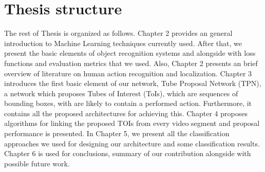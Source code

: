 \section{Thesis structure}
The rest of Thesis is organized as follows. Chapter 2 provides an general introduction to Machine Learning techniques currently used.
After that, we present the basic elements of object recognition systems and alongside with loss functions and evaluation metrics that
we used. Also, Chapter 2 presents an brief overview of literature on human action recognition and localization. Chapter 3 introduces the first basic element of our network, Tube Proposal Network (TPN), a network which proposes Tubes of Interest (ToIs), which are sequences of bounding boxes, with are likely to contain a performed action. Furthermore, it contains all the proposed architectures for achieving this.
Chapter 4 proposes algorithms for linking the proposed TOIs from every video segment and proposal performance is presented.
In Chapter 5, we present all the classification approaches we used for designing our architecture and some classification results.
Chapter 6 is used for conclusions, summary of our contribution alongside with possible future work.

% 
